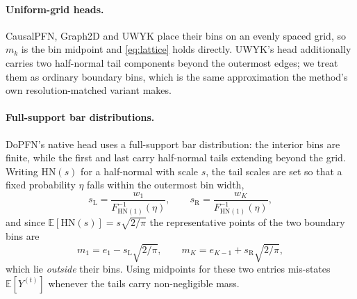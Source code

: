 \paragraph{Uniform-grid heads.}
CausalPFN, Graph2D and UWYK place their bins on an evenly spaced grid, so
$m_k$ is the bin midpoint and \eqref{eq:lattice} holds directly. UWYK's head
additionally carries two half-normal tail components beyond the outermost
edges; we treat them as ordinary boundary bins, which is the same
approximation the method's own resolution-matched variant makes.

\paragraph{Full-support bar distributions.}
DoPFN's native head uses a full-support bar distribution: the interior bins
are finite, while the first and last carry half-normal tails extending beyond
the grid. Writing $\mathrm{HN}(s)$ for a half-normal with scale $s$, the tail
scales are set so that a fixed probability $\eta$ falls within the outermost
bin width,
\begin{equation}
  s_{\mathrm{L}} = \frac{w_1}{F^{-1}_{\mathrm{HN}(1)}(\eta)},
  \qquad
  s_{\mathrm{R}} = \frac{w_K}{F^{-1}_{\mathrm{HN}(1)}(\eta)},
\end{equation}
and since $\mathbb{E}[\mathrm{HN}(s)] = s\sqrt{2/\pi}$ the representative
points of the two boundary bins are
\begin{equation}
  m_1 = e_1 - s_{\mathrm{L}}\sqrt{2/\pi},
  \qquad
  m_K = e_{K-1} + s_{\mathrm{R}}\sqrt{2/\pi},
  \label{eq:tailmeans}
\end{equation}
which lie \emph{outside} their bins. Using midpoints for these two entries
mis-states $\mathbb{E}[Y^{(t)}]$ whenever the tails carry non-negligible mass.

